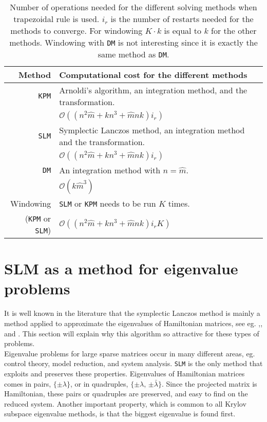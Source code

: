 \begin{table}
\caption{ Number of operations needed for the different solving methods when trapezoidal rule is used. $i_r$ is the number of restarts needed for the methods to converge. For windowing $K\cdot k$ is equal to $k$ for the other methods. Windowing with \texttt{DM} is not interesting since it is exactly the same method as \texttt{DM}. }
\centering
\begin{tabular}{r | l}
Method & Computational cost for the different methods \\
\hline
\texttt{KPM} & Arnoldi's algorithm, an integration method, and the transformation.\\ 
& $ \mathcal{O}((n^2 \hat{m} + k n^3 + \hat{m}nk)i_r)$ \\ 
\texttt{SLM} & Symplectic Lanczos method, an integration method and the transformation. \\
& $ \mathcal{O}((n^2 \hat{m} + k n^3 + \hat{m}nk)i_r) $  \\
\texttt{DM} & An integration method with $n = \hat{m}$. \\
 & $\mathcal{O}(k\hat{m}^3)$ \\
Windowing  & \texttt{SLM} or \texttt{KPM} needs to be run $K$ times. \\ (\texttt{KPM} or \texttt{SLM}) 
& $\mathcal{O}((n^2 \hat{m} + k n^3 + \hat{m}nk)i_r K)$ \\
\end{tabular}
\label{tab:cc}

\end{table}



\section{SLM as a method for eigenvalue problems} %
It is well known in the literature that the symplectic Lanczos method is mainly a method applied to approximate the eigenvalues of Hamiltonian matrices, see eg. \cite{SLM1},\cite{SLM2}, and \cite{SLM4}. This section will explain why this algorithm so attractive for these types of problems. \\

\noindent Eigenvalue problems for large sparse matrices occur in many different areas, eg. control theory, model reduction, and system analysis. 
\texttt{SLM} is the only method that exploits and preserves these properties. Eigenvalues of Hamiltonian matrices comes in pairs, $\{ \pm \lambda \} $, or in quadruples, $\{ \pm \lambda $, $\pm \bar{\lambda} \} $. Since the projected matrix is Hamiltonian, these pairs or quadruples are preserved, and easy to find on the reduced system. Another important property, which is common to all Krylov subspace eigenvalue methods, is that the biggest eigenvalue is found first.  \\

